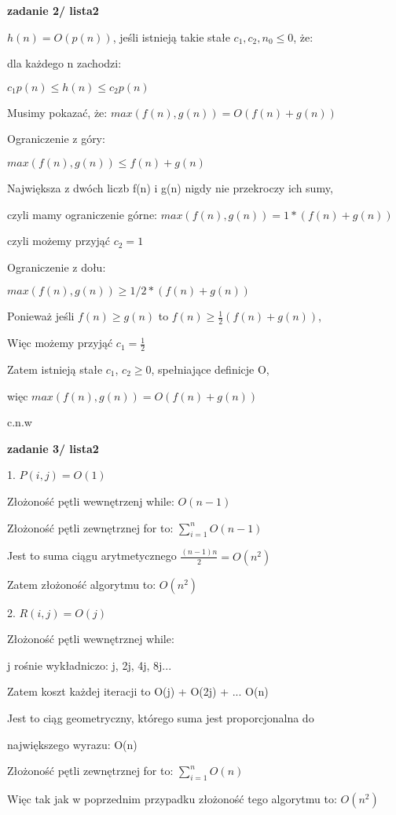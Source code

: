 \documentclass{article}
\begin{document}
    \vspace{1\baselineskip}
    \textbf{zadanie 2/ lista2} \par
    $h(n) = O(p(n))$, jeśli istnieją takie stałe $c_1, c_2, n_0 \leq 0$, że: \par
    dla każdego n zachodzi: \par
    $c_1p(n) \leq h(n) \leq c_2p(n)$ \par
    Musimy pokazać, że: $max(f(n), g(n)) = O(f(n) + g(n))$ \par
    Ograniczenie z góry: \par
    $max(f(n), g(n)) \leq f(n) + g(n)$ \par
    Największa z dwóch liczb f(n) i g(n) nigdy nie przekroczy ich sumy, \par
    czyli mamy ograniczenie górne: $max(f(n), g(n)) = 1 * (f(n) + g(n))$ \par
    czyli możemy przyjąć $c_2 = 1$ \par
    Ograniczenie z dołu: \par
    $max(f(n), g(n)) \geq 1/2 * (f(n) + g(n))$ \par
    Ponieważ jeśli $f(n) \geq g(n)$ to $f(n) \geq \frac{1}{2}(f(n) + g(n))$, \par
    Więc możemy przyjąć $c_1 = \frac{1}{2}$ \par
    Zatem istnieją stałe $c_1$, $c_2 \geq 0$, spełniające definicje O, \par
    więc $max(f(n), g(n)) = O(f(n) + g(n))$ \par
    c.n.w \par
    \vspace{1\baselineskip}
    \textbf{zadanie 3/ lista2} \par
    1. $P(i, j) = O(1)$ \par
    Złożoność pętli wewnętrzenj while: $O(n - 1)$ \par
    Złożoność pętli zewnętrznej for to: $\sum_{i = 1}^{n} O(n-1)$ \par
    Jest to suma ciągu arytmetycznego $\frac{(n-1)n}{2} = O(n^2)$ \par
    Zatem złożoność algorytmu to: $O(n^2)$ \par
    \vspace{1\baselineskip}
    2. $R(i, j) = O(j)$ \par
    Złożoność pętli wewnętrznej while: \par
    j rośnie wykładniczo: j, 2j, 4j, 8j...\par
    Zatem koszt każdej iteracji to O(j) + O(2j) + ... O(n) \par
    Jest to ciąg geometryczny, którego suma jest proporcjonalna do  \par
    największego wyrazu: O(n) \par
    Złożoność pętli zewnętrznej for to: $\sum_{i = 1}^{n} O(n)$ \par
    Więc tak jak w poprzednim przypadku złożoność tego algorytmu to: $O(n^2)$ \par
    \vspace{1\baselineskip}
\end{document}
